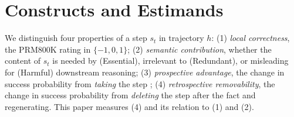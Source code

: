 \documentclass[11pt]{article}
\begin{document}
\section{Constructs and Estimands}
\label{sec:constructs}

We distinguish four properties of a step $s_t$ in trajectory $h$:
(1) \emph{local correctness}, the PRM800K rating in $\{-1,0,1\}$;
(2) \emph{semantic contribution}, whether the content of $s_t$ is needed by (Essential), irrelevant to (Redundant), or misleading for (Harmful) downstream reasoning;
(3) \emph{prospective advantage}, the change in success probability from \emph{taking} the step \citep{setlur2025rewarding};
(4) \emph{retrospective removability}, the change in success probability from \emph{deleting} the step after the fact and regenerating.
This paper measures (4) and its relation to (1) and (2).
\end{document}
